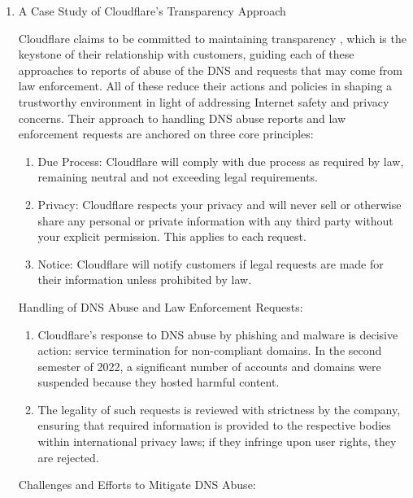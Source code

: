 \begin{enumerate}
    \item A Case Study of Cloudflare's Transparency Approach

Cloudflare claims to be committed to maintaining transparency \cite{cloudflare_transparency_2022}, which is the keystone of their relationship with customers, guiding each of these approaches to reports of abuse of the DNS and requests that may come from law enforcement. All of these reduce their actions and policies in shaping a trustworthy environment in light of addressing Internet safety and privacy concerns. Their approach to handling DNS abuse reports and law enforcement requests are anchored on three core principles:


\begin{enumerate}
    \item Due Process: Cloudflare will comply with due process as required by law, remaining neutral and not exceeding legal requirements.
    
    \item Privacy: Cloudflare respects your privacy and will never sell or otherwise share any personal or private information with any third party without your explicit permission. This applies to each request.
    
    \item Notice: Cloudflare will notify customers if legal requests are made for their information unless prohibited by law.

\end{enumerate}

Handling of DNS Abuse and Law Enforcement Requests:

\begin{enumerate}
    \item Cloudflare's response to DNS abuse by phishing and malware is decisive action: service termination for non-compliant domains. In the second semester of 2022, a significant number of accounts and domains were suspended because they hosted harmful content.

    \item The legality of such requests is reviewed with strictness by the company, ensuring that required information is provided to the respective bodies within international privacy laws; if they infringe upon user rights, they are rejected.   
\end{enumerate}

Challenges and Efforts to Mitigate DNS Abuse:


\end{enumerate}
